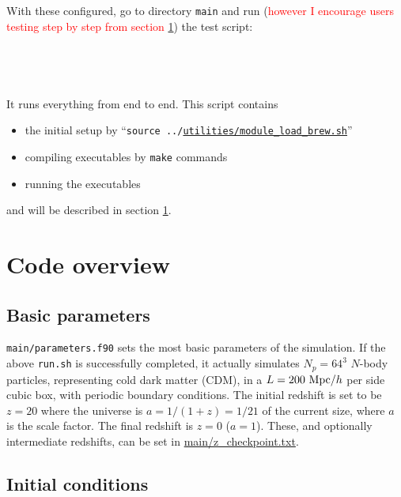 \documentclass[12pt]{article}
\newcommand{\tcr}{\textcolor{red}}
\begin{document}
\\\\
With these configured, go to directory {\tt main} and run (\tcr{however I encourage users testing step by step from section \ref{s.code}}) the test script:
\\\\
\\
\\\\
It runs everything from end to end. This script contains 
\begin{itemize}
	\item the initial setup by ``{\tt source ../\url{utilities/module_load_brew.sh}}''
	\item compiling executables by {\tt make} commands
	\item running the executables
\end{itemize}
and will be described in section \ref{s.code}.

\section{Code overview}\label{s.code}

\subsection{Basic parameters}
{\tt main/parameters.f90} sets the most basic parameters of the simulation. If the above {\tt run.sh} is successfully completed, it actually simulates $N_p=64^3$ $N$-body particles, representing cold dark matter (CDM), in a $L=200\ {\rm Mpc}/h$ per side cubic box, with periodic boundary conditions. The initial redshift is set to be $z=20$ where the universe is $a=1/(1+z)=1/21$ of the current size, where $a$ is the scale factor. The final redshift is $z=0$ ($a=1$). These, and optionally intermediate redshifts, can be set in \url{main/z_checkpoint.txt}.

\subsection{Initial conditions}
\end{document}
